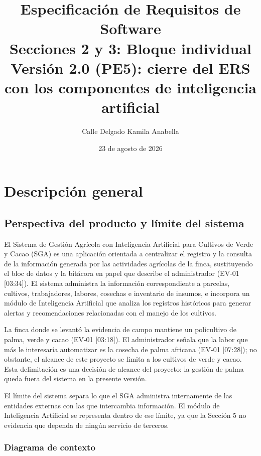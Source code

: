 \documentclass[12pt,a4paper]{article}
\title{Especificación de Requisitos de Software\\Secciones 2 y 3: Bloque individual\\[2mm]\large Versión 2.0 (PE5): cierre del ERS con los componentes de inteligencia artificial}
\author{Calle Delgado Kamila Anabella}
\date{23 de agosto de 2026}
\begin{document}
\maketitle
\setcounter{section}{1}

\section{Descripción general}
\label{sec:descripcion-general}

\subsection{Perspectiva del producto y límite del sistema}
\label{sec:perspectiva-producto}

El Sistema de Gestión Agrícola con Inteligencia Artificial para Cultivos de Verde y Cacao (SGA) es una aplicación orientada a centralizar el registro y la consulta de la información generada por las actividades agrícolas de la finca, sustituyendo el bloc de datos y la bitácora en papel que describe el administrador (EV-01 [03:34]). El sistema administra la información correspondiente a parcelas, cultivos, trabajadores, labores, cosechas e inventario de insumos, e incorpora un módulo de Inteligencia Artificial que analiza los registros históricos para generar alertas y recomendaciones relacionadas con el manejo de los cultivos.

La finca donde se levantó la evidencia de campo mantiene un policultivo de palma, verde y cacao (EV-01 [03:18]). El administrador señala que la labor que más le interesaría automatizar es la cosecha de palma africana (EV-01 [07:28]); no obstante, el alcance de este proyecto se limita a los cultivos de verde y cacao. Esta delimitación es una decisión de alcance del proyecto: la gestión de palma queda fuera del sistema en la presente versión.

El límite del sistema separa lo que el SGA administra internamente de las entidades externas con las que intercambia información. El módulo de Inteligencia Artificial se representa dentro de ese límite, ya que la Sección 5 no evidencia que dependa de ningún servicio de terceros.

\subsubsection{Diagrama de contexto}
\label{sec:diagrama-contexto-texto}
\end{document}
